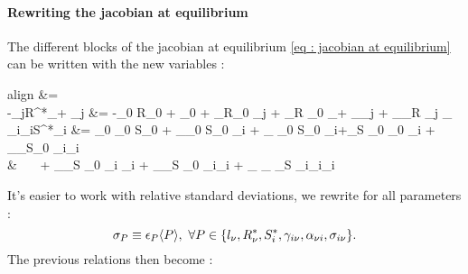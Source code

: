 \documentclass[12pt, titlepage]{report}
\begin{document}
	 \paragraph{Rewriting the jacobian at equilibrium}
	 The different blocks of the jacobian at equilibrium \eqref{eq : jacobian at equilibrium} can be written with the new variables :
	 \begin{empheq}[left=\empheqlbrace]{align}
	  &=  \\
	 -\gamma_{j\mu}R^*_\mu + \alpha_{\mu j} &= -\gamma_0 R_0 + \alpha_0 + \sigma_\gamma R_0 \tilde{\gamma}_{j\mu} + \sigma_R \gamma_0 _\mu + \sigma_\alpha \tilde{\alpha}_{\mu j} + \sigma_\gamma \sigma_R \tilde{\gamma}_{j\mu} _\mu \\
	 \sigma_{i\nu}\gamma_{i\nu}S^*_i &= \sigma_0 \gamma_0 S_0 + \sigma_\sigma \gamma_0 S_0 \tilde{\sigma}_{i\nu} + \sigma_{\gamma} \sigma_0 S_0 \tilde{\gamma}_{i\nu}+\sigma_S \sigma_0 \gamma_0 _i + \sigma_\sigma \sigma_\gamma S_0 \tilde{\sigma}_{i\nu}\tilde{\gamma}_{i\nu} \nonumber \\
	  & \ \ \ + \sigma_\sigma \sigma_S \gamma_0 \tilde{\sigma}_{i\nu} _i + \sigma_\gamma \sigma_S \sigma_0 \tilde{\gamma}_{i\nu}_i + \sigma_{\sigma} \sigma_{\gamma} \sigma_{S} \tilde{\sigma}_{i\nu}\tilde{\gamma}_{i\nu}_i
	 \end{empheq}
	 It's easier to work with relative standard deviations, \ie we rewrite for all parameters :
	 \begin{equation}
	 \sigma_P \equiv \epsilon_P \langle P \rangle, \ \forall P \in\{l_\nu, R^*_\nu, S^*_i, \gamma_{i\nu}, \alpha_{\nu i}, \sigma_{i\nu}\}.
	 \end{equation}
	 The previous relations then become :
\end{document}
